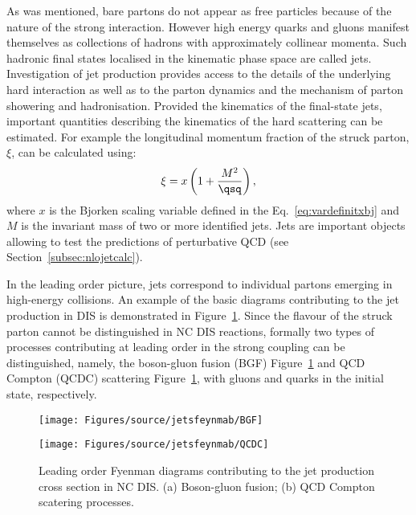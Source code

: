 As was mentioned, bare partons do not appear as free particles because of the nature of the strong interaction. However high energy quarks and gluons manifest themselves as collections of hadrons with approximately collinear momenta. Such hadronic final states localised in the kinematic phase space are called jets. Investigation of jet production provides access to the details of the underlying hard interaction as well as to the parton dynamics and the mechanism of parton showering and hadronisation. Provided the kinematics of the final-state jets, important quantities describing the kinematics of the hard scattering can be estimated. For example the longitudinal momentum fraction of the struck parton, $\xi$, can be calculated using:
\begin{equation}
\xi = x\left(1+\frac{M^2}{\qsq}\right),
\label{eq:xidef}
\end{equation}
where $x$ is the Bjorken scaling variable defined in the Eq.~\eqref{eq:vardefinitxbj} and $M$ is the invariant mass of two or more identified jets. Jets are important objects allowing to test the predictions of perturbative QCD (see Section~\ref{subsec:nlojetcalc}).

In the leading order picture, jets correspond to individual partons emerging in high-energy collisions. An example of the basic diagrams contributing to the jet production in DIS is demonstrated in Figure~\ref{fig:LOFeynmandiags}. Since the flavour of the struck parton cannot be distinguished in NC DIS reactions, formally two types of processes contributing at leading order in the strong coupling can be distinguished, namely, the boson-gluon fusion (BGF) Figure~\ref{fig:LOFeynmandiags} and QCD Compton (QCDC) scattering Figure~\ref{fig:LOFeynmandiags}, with gluons and quarks in the initial state, respectively.
\begin{figure}
	\centering
	\begin{subfloat}[]{
		\texttt{[image: Figures/source/jetsfeynmab/BGF]}
		\label{subfig:lobgf}
		}%
		\end{subfloat}
		\begin{subfloat}[]{
		\texttt{[image: Figures/source/jetsfeynmab/QCDC]}
		\label{subfig:loqcdc}
		}%
		\end{subfloat}
	\caption{Leading order Fyenman diagrams contributing to the jet production cross section in NC DIS. (a) Boson-gluon fusion; (b) QCD Compton scatering processes.}
	\label{fig:LOFeynmandiags}
\end{figure}


